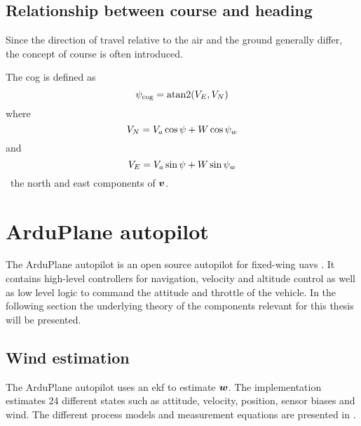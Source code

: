 \subsection{Relationship between course and heading}
Since the direction of travel relative to the air and the ground generally differ, the concept of course is often 
introduced.

\begin{definition}[Course]
    The \ac{cog} is defined as 
    \begin{equation}\label{eq:cog}
        \cog = \atan2(V_E,V_N)
    \end{equation}
    where
    \begin{equation}
        V_N=V_a\cos\psi + W\cos\psi_w
    \end{equation}
    and
    \begin{equation}
        V_E=V_a\sin\psi + W\sin\psi_w
    \end{equation}
    \ie\ the north and east components of $\boldsymbol{v}$.
\end{definition}


\section{ArduPlane autopilot}
The ArduPlane autopilot is an open source autopilot for fixed-wing \acp{uav} \cite{arduplane}. 
It contains high-level controllers for navigation, velocity and altitude control as well as 
low level logic to command the attitude and throttle of the vehicle. In the following section
the underlying theory of the components relevant for this thesis will be presented.

\subsection{Wind estimation}
The ArduPlane autopilot uses an \ac{ekf} to estimate $\boldsymbol{w}$. The implementation estimates 24 different states such as attitude, velocity, position, sensor biases and wind. The different process models and 
measurement equations are presented in \cite{px4_ecl_ekf}.

